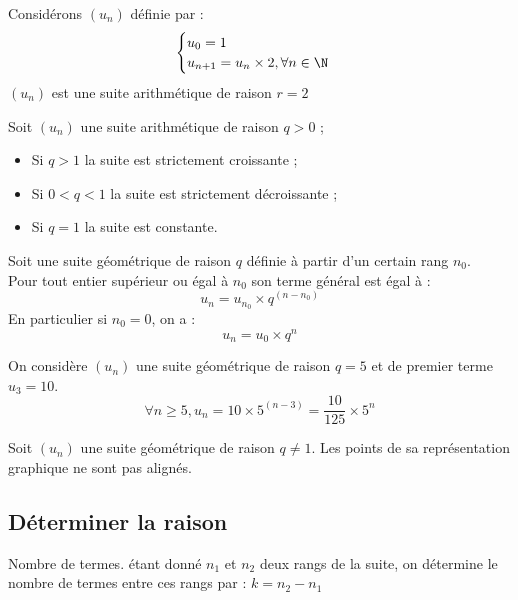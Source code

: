 \documentclass[11pt]{article}
\begin{document}
\begin{exemple}
Considérons $(u_n)$ définie par :
\[ \begin{cases}
u_0 = 1 \\
u_{n+1} = u_n \times 2, \forall n
\in \N
\end{cases} \]
$(u_n)$ est une suite arithmétique de raison $r=2$
\end{exemple}

\begin{propriete}
Soit $(u_n)$ une suite arithmétique de raison $q>0$ ;
\begin{itemize}
\item Si $q > 1$ la suite est strictement croissante ;
\item Si $0 < q < 1$ la suite est strictement décroissante ;
\item Si $q = 1$ la suite est constante.
\end{itemize}
\end{propriete}


\begin{theoreme}
Soit une suite géométrique de raison $q$ définie à partir d'un
certain rang $n_0$.\\
Pour tout entier supérieur ou égal à $n_0$ son terme général est égal à :
\[ u_n = u_{n_0} \times q^{(n-n_0)}\]
En particulier si $n_0=0$, on a : 
\[ u_n = u_0 \times q^n\]
\end{theoreme}

\begin{exemple}
On considère $(u_n)$ une suite géométrique de raison $q=5$ et de
premier terme $u_3=10$.
\[ \forall n \ge 5, u_n=10 \times 5^{(n-3)} = \dfrac{10}{125} \times 5^n\]
\end{exemple}

\begin{propriete}
Soit $(u_n)$ une suite géométrique de raison $q \neq 1$. Les points de
sa représentation graphique ne sont pas alignés.
\end{propriete}

\subsection{Déterminer la raison}

\begin{definition}{Nombre de termes.}
étant donné $n_1$ et $n_2$ deux rangs de la suite, on détermine le
nombre de termes entre ces rangs par : $k=n_2-n_1$
\end{definition}
\end{document}

